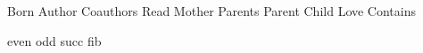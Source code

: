 
\DefRel Born
\DefRel Author
\DefRel Coauthors
\DefRel Read
\DefRel Mother
\DefRel Parents
\DefRel Parent
\DefRel Child
\DefRel Love
\DefRel Contains

\DefFun even
\DefFun odd
\DefFun succ
\DefFun fib

\def\Smile{\rel{\ddot\smile}}
\def\Frown{\rel{\ddot\frown}}

